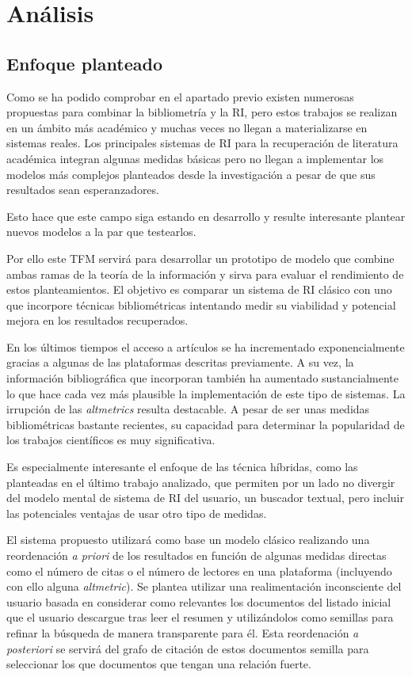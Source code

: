 \chapter{Análisis}

\section{Enfoque planteado}
Como se ha podido comprobar en el apartado previo existen numerosas propuestas para combinar la bibliometría y la \acrshort{RI}, pero estos trabajos se realizan en un ámbito más académico y muchas veces no llegan a materializarse en sistemas reales. Los principales sistemas de \acrshort{RI} para la recuperación de literatura académica integran algunas medidas básicas pero no llegan a implementar los modelos más complejos planteados desde la investigación a pesar de que sus resultados sean esperanzadores. 

Esto hace que este campo siga estando en desarrollo y resulte interesante plantear nuevos modelos a la par que testearlos.

Por ello este \acrshort{TFM} servirá para desarrollar un prototipo de modelo que combine ambas ramas de la teoría de la información y sirva para evaluar el rendimiento de estos planteamientos. El objetivo es comparar un sistema de \acrshort{RI} clásico con uno que incorpore técnicas bibliométricas intentando medir su viabilidad y potencial mejora en los resultados recuperados.

En los últimos tiempos el acceso a artículos se ha incrementado exponencialmente gracias a algunas de las plataformas descritas previamente. A su vez, la información bibliográfica que incorporan también ha aumentado sustancialmente lo que hace cada vez más plausible la implementación de este tipo de sistemas. La irrupción de las \textit{altmetrics} resulta destacable. A pesar de ser unas medidas bibliométricas bastante recientes, su capacidad para determinar la popularidad de los trabajos científicos es muy significativa.

Es especialmente interesante el enfoque de las técnica híbridas, como las planteadas en el último trabajo analizado, que permiten por un lado no divergir del modelo mental de sistema de \acrshort{RI} del usuario, un buscador textual, pero incluir las potenciales ventajas de usar otro tipo de medidas. 

El sistema propuesto utilizará como base un modelo clásico realizando una reordenación \textit{a priori} de los resultados en función de algunas medidas directas como el número de citas o el número de lectores en una plataforma (incluyendo con ello alguna \textit{altmetric}). Se plantea utilizar una realimentación inconsciente del usuario basada en considerar como relevantes los documentos del listado inicial que el usuario descargue tras leer el resumen y utilizándolos como semillas para refinar la búsqueda de manera transparente para él. Esta reordenación  \textit{a posteriori} se servirá del grafo de citación de estos documentos semilla para seleccionar los que documentos que tengan una relación fuerte.

